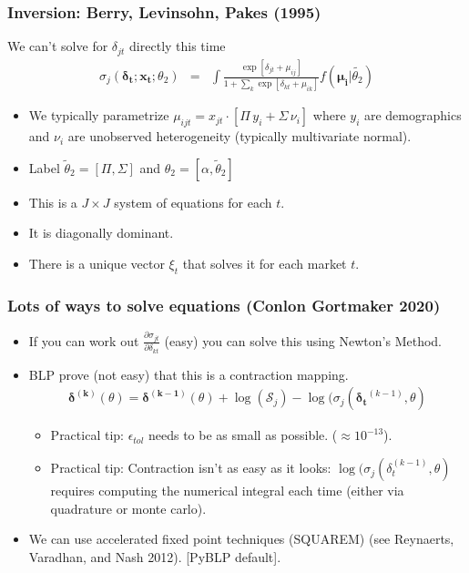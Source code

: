 \begin{frame}
\frametitle{Inversion: Berry, Levinsohn, Pakes (1995)}
We can't solve for $\delta_{jt}$ directly this time
\begin{eqnarray*}
\sigma_j(\boldsymbol{\delta_t}; \mathbf{x_t}; \theta_2) &=& \int \frac{\exp[\delta_{jt} +  \mu_{ij} ]}{1+\sum_k \exp[\delta_{kt} + \mu_{ik} ]} f(\boldsymbol{\mu_i}| \widetilde{\theta_2})
\end{eqnarray*}
 \begin{itemize}
    \item We typically parametrize $\mu_{ijt} = x_{jt} \cdot [\Pi \, y_i + \Sigma \, \nu_{i}]$ where $y_i$ are demographics and $\nu_i$ are unobserved heterogeneity (typically multivariate normal).
    \item Label $\widetilde{\theta}_2 = [\Pi, \Sigma]$ and $\theta_2 =[\alpha, \widetilde{\theta}_2 ]$
 \item This is a $J \times J$ system of equations for each $t$.
 \item It is diagonally dominant.
 \item There is a unique vector $\xi_t$ that solves it for each market $t$.
 \end{itemize}
\end{frame}

\begin{frame}
\frametitle{Lots of ways to solve equations (Conlon Gortmaker 2020)}
 \begin{itemize}
     \item If you can work out $\frac{\partial \sigma_{jt}}{\partial \delta_{kt}}$ (easy) you can solve this using Newton's Method. 
 \item BLP prove (not easy) that this is a \alert{contraction mapping}.
\begin{eqnarray*}
    \boldsymbol{\delta^{(k)}}(\theta) = \boldsymbol{\delta^{(k-1)}}(\theta) + \log(\mathcal{S}_{j}) - \log(\sigma_{j}(\boldsymbol{\delta_t}^{(k-1)}, \theta)
\end{eqnarray*}

\begin{itemize} 
  \item Practical tip: $\epsilon_{tol}$ needs to be as small as possible. ($\approx 10^{-13}$).
 \item Practical tip: Contraction isn't as easy as it looks:  $ \log(\sigma_{j}(\delta_t^{(k-1)}, \theta)$ requires computing the numerical integral each time (either via quadrature or monte carlo).
\end{itemize}
\item We can use \alert{accelerated fixed point} techniques (SQUAREM) (see Reynaerts, Varadhan, and Nash 2012). [PyBLP default].
  \end{itemize}
 \end{frame}


